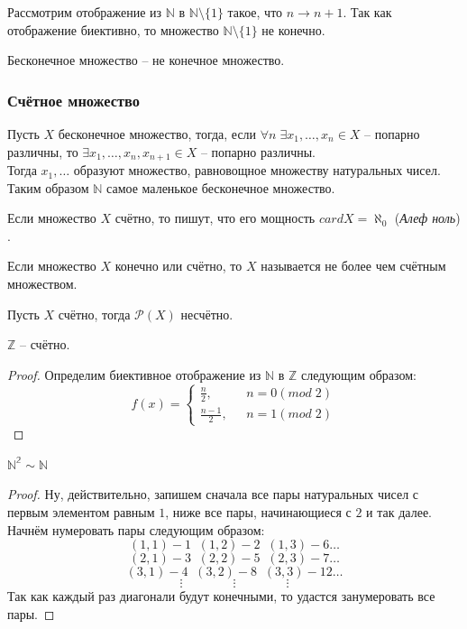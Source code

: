 Рассмотрим отображение из $\mathbb{N}$ в $\mathbb{N}\setminus\{1\}$ такое, что $n \rightarrow n+1.$ Так как отображение биективно, то множество $\mathbb{N}\setminus\{1\}$ не конечно.
\begin{Definition}
Бесконечное множество -- не конечное множество.
\end{Definition}

\subsubsection{Счётное множество}
Пусть $X$ бесконечное множество, тогда, если $\forall n \; \exists x_1,\ldots, x_n \in X$ -- попарно различны, то $\exists x_1,\ldots, x_n, x_{n+1} \in X$ -- попарно различны.\\

Тогда $x_1,\ldots$ образуют множество, равновощное множеству натуральных чисел. Таким образом $\mathbb{N}$ самое маленькое бесконечное множество.

\begin{Definition}
Если множество $X$ счётно, то пишут, что его мощность $cardX=\aleph_0$ (\textit{Алеф ноль})$.$
\end{Definition}

Если множество $X$ конечно или счётно, то $X$ называется не более чем счётным множеством.

Пусть $X$ счётно, тогда $\mathcal{P}(X)$ несчётно.\\

\begin{Proposition}
$\mathbb{Z}$ -- счётно.
\end{Proposition}
\begin{proof}
Определим биективное отображение из $\mathbb{N}$ в $\mathbb{Z}$ следующим образом: 
\begin{equation*}
f(x) = 
 \begin{cases}
   \frac{n}{2}, &\text{ $n = 0(mod \; 2) $}\\
   \frac{n-1}{2}, &\text{ $n = 1(mod \; 2)$}
 \end{cases}
\end{equation*}
\end{proof}

\begin{Proposition}
$\mathbb{N^2}\sim\mathbb{N}$ 
\end{Proposition}
\begin{proof}
Ну, действительно, запишем сначала все пары натуральных чисел с первым элементом равным $1$, ниже все пары, начинающиеся с $2$ и так далее. Начнём нумеровать пары следующим образом:
$$(1,1) - 1 \;\; (1,2) - 2 \;\; (1,3) - 6 \ldots$$
$$(2,1) - 3 \;\; (2,2) - 5 \;\; (2,3) - 7 \ldots$$
$$(3,1) - 4 \;\; (3,2) - 8 \;\; (3,3) - 12 \ldots$$
$$\vdots \quad\quad\quad\quad\vdots \quad\quad\quad\quad\vdots$$
Так как каждый раз диагонали будут конечными, то удастся занумеровать все пары.
\end{proof}

